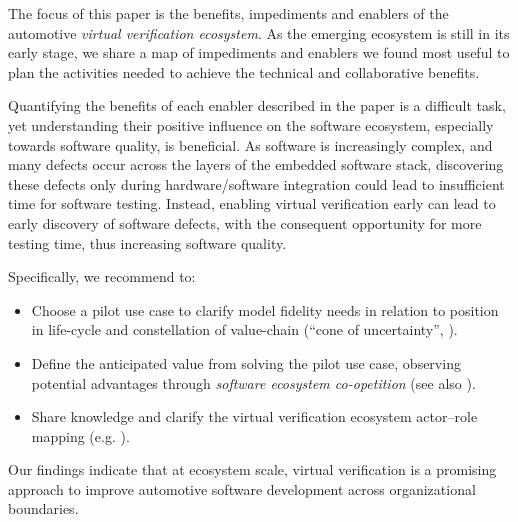 The focus of this paper is the benefits, impediments and enablers of the automotive \emph{virtual verification ecosystem}.
As the emerging ecosystem is still in its early stage, we share a map of impediments and enablers we found most useful to plan the activities needed to achieve the technical and collaborative benefits.

Quantifying the benefits of each enabler described in the paper is a difficult task,
yet understanding their positive influence on the software ecosystem, especially towards software quality, is beneficial.
As software is increasingly complex, and many defects occur across the layers of the embedded software stack, discovering these defects only during hardware/software integration could lead to %
insufficient time for software testing.
Instead, enabling %
virtual verification %
early %
can lead to early discovery of software defects, with the consequent opportunity for more testing time, thus increasing %
software quality.

Specifically, we recommend to:
\begin{itemize}
    \item Choose a pilot use case to clarify model fidelity needs in relation to position in life-cycle and constellation of value-chain (``cone of uncertainty'', \cite{Boehm1981}).
    \item Define the anticipated value from solving the pilot use case, observing potential advantages through \emph{software ecosystem co-opetition} (see also \cite{Agerfalk2008}).
    \item %
    {Share} knowledge and clarify %
    the {virtual verification ecosystem} actor--role mapping (e.g. \cite{kilamo2012proprietary}).
\end{itemize}

Our findings indicate that at ecosystem scale, virtual verification is a promising approach to improve automotive software development across organizational boundaries.



